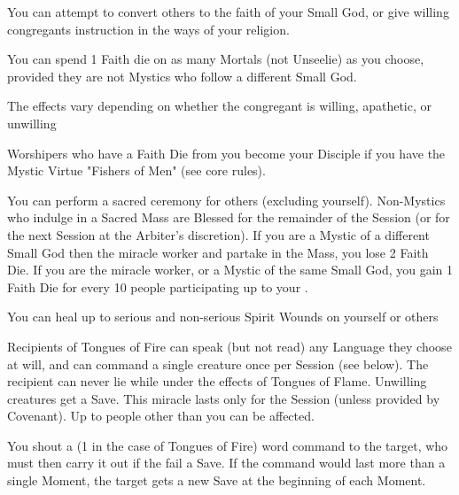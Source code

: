 
You can attempt to convert others to the faith of your Small God, or give willing congregants instruction in the ways of your religion.  

You can spend 1 Faith die on as many Mortals (not Unseelie) as you choose, provided they are not Mystics who follow a different Small God.

The effects vary depending on whether the congregant is willing, apathetic, or unwilling


Worshipers who have a Faith Die from you become your Disciple if you have the Mystic Virtue "Fishers of Men" (see core rules).


You can perform a sacred ceremony for \SUMDICE others (excluding yourself).  Non-Mystics who indulge in a Sacred Mass are Blessed for the remainder of the Session (or for the next Session at the Arbiter's discretion).  If you are a Mystic of a different Small God then the miracle worker and partake in the Mass, you lose 2 Faith Die.  If you are the miracle worker, or a Mystic of the same Small God, you gain 1 Faith Die for every 10 people participating up to your \MAX.




You can heal up to \DICE serious and non-serious Spirit Wounds on yourself or others

\cbreak


Recipients of Tongues of Fire can speak (but not read) any Language they choose at will, and can command a single creature once per Session (see below).  The recipient can never lie while under the effects of Tongues of Flame.  Unwilling creatures get a Save.  This miracle lasts only for the Session (unless provided by Covenant). Up to \SUMDICE people other than you can be affected. 


\MYSTERY [
  Name= Command,
  Link=miracle-command,
  Paradigm=Mind,
  Save=Y,
  Duration=0 ,
  Counter= n/a  ,
  Keywords=None ,
  Target=Nearby creature
]

You shout a \DICE (1 in the case of Tongues of Fire) word command to the target, who must then carry it out if the fail a Save.  If the command would last more than a single Moment, the target gets a new Save at the beginning of each Moment.

